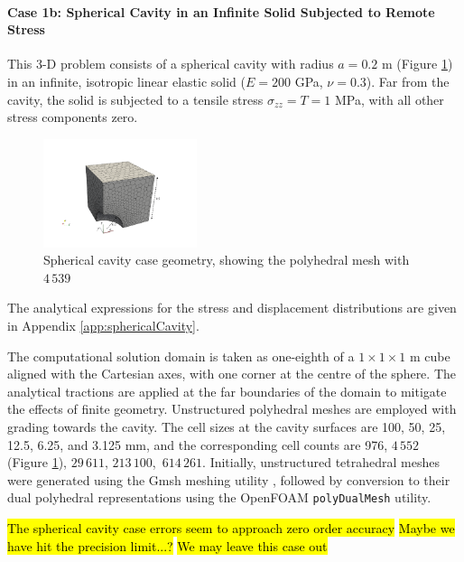 \documentclass[sn-mathphys,Numbered]{sn-jnl}%
\begin{document}
\paragraph{Case 1b: Spherical Cavity in an Infinite Solid Subjected to Remote Stress}
This 3-D problem consists of a spherical cavity with radius $a = 0.2$ m (Figure \ref{fig:spherical_cavity}) in an infinite, isotropic linear elastic solid ($E = 200$ GPa, $\nu = 0.3$).
Far from the cavity, the solid is subjected to a tensile stress $\sigma_{zz} = T = 1$ MPa, with all other stress components zero.
\begin{figure}[htbp]
   \centering
   \includegraphics[width=0.4\textwidth]{figures/spherical_cavity.pdf} 
   \caption{Spherical cavity case geometry, showing the polyhedral mesh with $4\,539$}
   \label{fig:spherical_cavity}
\end{figure}
The analytical expressions for the stress and displacement distributions are given in Appendix \ref{app:sphericalCavity}.


The computational solution domain is taken as one-eighth of a $1 \times 1 \times 1$ m cube aligned with the Cartesian axes, with one corner at the centre of the sphere.
The analytical tractions are applied at the far boundaries of the domain to mitigate the effects of finite geometry.
Unstructured polyhedral meshes are employed with grading towards the cavity.
The cell sizes at the cavity surfaces are 100, 50, 25, 12.5, 6.25, and 3.125 mm, and the corresponding cell counts are 976, $4\,552$ (Figure \ref{fig:spherical_cavity}), $29\,611$, $213\,100$, $\,614\,261$.
Initially, unstructured tetrahedral meshes were generated using the Gmsh meshing utility \cite{geuzaine2009gmsh}, followed by conversion to their dual polyhedral representations using the OpenFOAM \texttt{polyDualMesh} utility.

\hl{The spherical cavity case errors seem to approach zero order accuracy}
\hl{Maybe we have hit the precision limit...?}
\hl{We may leave this case out}
\end{document}
